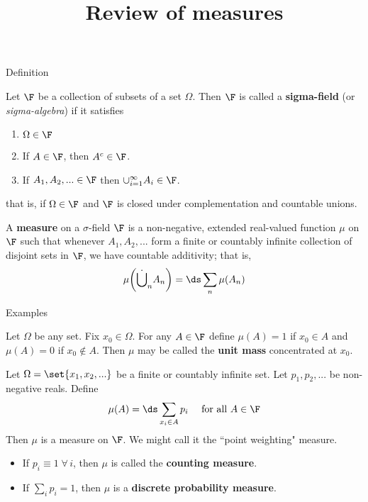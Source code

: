 \documentclass[10pt]{beamer}
\title{Review of measures}
\begin{document}
\maketitle

\begin{frame}{Definition}


\begin{definition}
Let $\F$ be a collection of subsets of a set $\Omega$.  Then $\F$ is called a \textbf{sigma-field} (or \textit{sigma-algebra}) if it satisfies

\begin{enumerate}
	\item $\Omega \in \F$ 
	\item If $A \in \F$, then $A^c \in \F$.
	\item If $A_1,A_2, ... \in \F$ then $\cup_{i=1}^\infty A_i \in \F$.  
\end{enumerate}
that is, if $\Omega \in \F$ and $\F$ is closed under complementation and countable unions.
\label{def:sigma_field}	
\end{definition}
\pause 
\begin{definition}
A \textbf{measure} on a $\sigma$-field $\F$ is a non-negative, extended real-valued function $\mu$ on $\F$ such that whenever $A_1, A_2, ...$ form a finite or countably infinite collection of disjoint sets in $\F$, we have countable additivity; that is,
\[ \mu \bigg( \dot\bigcup_n A_n \bigg) = \ds\sum_n \mu(A_n) \]
\label{def:measure}	
\end{definition}


\end{frame}

\begin{frame}{Examples}

\begin{example}
Let $\Omega$ be any set.  Fix $x_0 \in \Omega$. For any $A \in \F$ define $\mu(A) = 1$ if $x_0 \in A$ and $\mu(A) = 0$ if $x_0 \not\in A$.  Then $\mu$ may be called the \textbf{unit mass} concentrated at $x_0$.
\end{example}
\pause 
\begin{example}
Let $\Omega = \set{x_1,x_2,...}$ be a finite or countably infinite set.  Let $p_1, p_2,...$ be non-negative reals.  Define
\[\mu(A) = \ds\sum_{x_i \in A} p_i \quad \text{ for all } A \in \F\]
Then $\mu$ is a measure on $\F$. We might call it the ``point weighting" measure. 
\begin{itemize}
\item If $p_i \equiv 1 \; \forall \, i$, then $\mu$ is called the \textbf{counting measure}.
\item If $\sum_i p_i =1$, then $\mu$ is a \textbf{discrete probability measure}.	
\end{itemize}
	
\end{example}
\end{frame}
\end{document}
